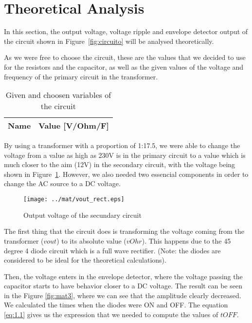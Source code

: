 \section{Theoretical Analysis}
\label{sec:analysis}

\hspace{0,5cm} In this section, the output voltage, voltage ripple and envelope detector output of the circuit shown in Figure~\ref{fig:circuito} will be analysed theoretically.

As we were free to choose the circuit, these are the values that we decided to use for the resistors and the capacitor, as well as the given values of the voltage and frequency of the primary circuit in the transformer.

\begin{table}[H]
  \centering
  \begin{tabular}{|l|r|}
    \hline    
    {\bf Name} & {\bf Value [V/Ohm/F]} \\ \hline
    
  \end{tabular}
  \caption{Given and choosen variables of the circuit}
  \label{tab:mat1}
\end{table}

By using a transformer with a proportion of 1:17.5, we were able to change the voltage from a value as high as 230V is in the primary circuit to a value which is much closer to the aim (12V) in the secondary circuit, with the voltage being shown in Figure~\ref{fig:mat2}. However, we also needed two essencial components in order to change the AC source to a DC voltage.

\begin{figure}[H] \centering
\texttt{[image: ../mat/vout\_rect.eps]}
\caption{Output voltage of the secundary circuit}
\label{fig:mat2}
\end{figure}

The first thing that the circuit does is transforming the voltage coming from the transformer ($vout$) to its absolute value ($vOhr$). This happens due to the 45 degree 4 diode circuit which is a full wave rectifier. (Note: the diodes are considered to be ideal for the theoretical calculations).

Then, the voltage enters in the envelope detector, where the voltage passing the capacitor starts to have behavior closer to a DC voltage. The result can be seen in the Figure \ref{fig:mat3}, where we can see that the amplitude clearly decreased. We calculated the times when the diodes were ON and OFF. The equation \ref{eq:1.1} gives us the expression that we needed to compute the values of $tOFF$.

